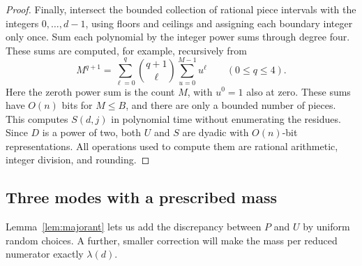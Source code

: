 \begin{proof}
Finally, intersect the bounded collection of rational piece intervals with
the integers \(0,\ldots,d-1\), using floors and ceilings and assigning each
boundary integer only once.  Sum each polynomial by the integer power sums
through degree four.  These sums are computed, for example, recursively
from
\[
 M^{q+1}=\sum_{\ell=0}^q\binom{q+1}{\ell}
             \sum_{u=0}^{M-1}u^\ell
 \qquad (0\le q\le4).
\]
Here the zeroth power sum is the count \(M\), with \(u^0=1\) also at zero.
These sums have \(O(n)\) bits for \(M\le B\), and there are only a bounded number
of pieces.  This computes \(S(d,j)\) in polynomial time without enumerating
the residues.  Since \(D\) is a power of two, both \(U\) and \(S\) are
dyadic with \(O(n)\)-bit representations.  All operations used to compute
them are rational arithmetic, integer division, and rounding.
\end{proof}

\subsection{Three modes with a prescribed mass}

Lemma~\ref{lem:majorant} lets us add the discrepancy between \(P\) and \(U\)
by uniform random choices.  A further, smaller correction will make the
mass per reduced numerator exactly \(\lambda(d)\).

